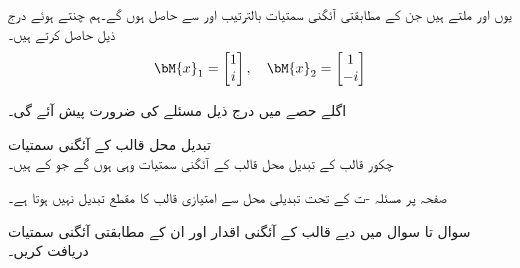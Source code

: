 یوں  اور  ملتے ہیں جن کے مطابقتی آئگنی سمتیات بالترتیب  اور  سے حاصل ہوں گے۔ہم  چنتے ہوئے درج ذیل حاصل کرتے ہیں۔
\begin{align*}
\bM{x}_1=\begin{bmatrix} 1\\i \end{bmatrix}, \quad \bM{x}_2=\begin{bmatrix} 1\\-i \end{bmatrix}
\end{align*}
 
اگلے حصے میں درج ذیل مسئلے کی ضرورت پیش آئے گی۔

\quad تبدیل محل قالب کے آئگنی سمتیات\\
چکور قالب  کے تبدیل محل قالب  کے آئگنی سمتیات وہی ہوں گے جو   کے ہیں۔ 

صفحہ  پر مسئلہ -ت کے تحت تبدیلی محل سے امتیازی قالب کا مقطع تبدیل نہیں ہوتا ہے۔ 

سوال  تا سوال  میں دیے قالب کے  آئگنی اقدار اور ان کے مطابقتی آئگنی سمتیات دریافت کریں۔

